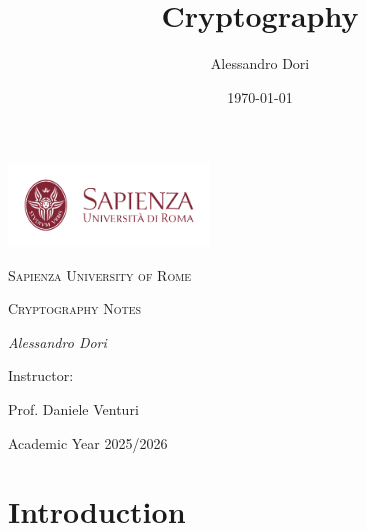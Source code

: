 \documentclass{article}
\title{Cryptography}
\author{Alessandro Dori}
\date{\today}
\begin{document}
\begin{titlepage}
    \centering
        \vspace*{1in}
        
        \includegraphics[width=0.4\textwidth]{Immagini/logo-sapienza.png}\par\vspace{1cm}
        
        {\scshape\LARGE Sapienza University of Rome \par}
        \vspace{1.5cm}
        
         {\scshape\Large Cryptography Notes\par}
        \vspace{1.5cm}
        
        {\Large\itshape Alessandro Dori\par}
        
        \vspace{3cm}
        
        Instructor:\par
        {\large Prof. Daniele Venturi\par}
        
        \vfill
        
        {\large Academic Year 2025/2026\par}
    
\end{titlepage}

\maketitle
\tableofcontents
\newpage


\section{Introduction}
\end{document}
